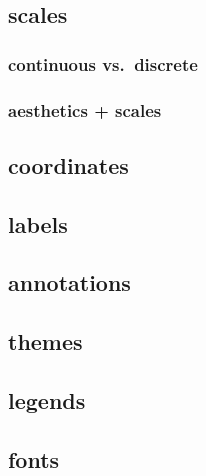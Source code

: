 \documentclass[
]{book}
\begin{document}
\hypertarget{scales}{%
\subsection*{scales}\label{scales}}

\hypertarget{continuous-vs.-discrete}{%
\subsubsection*{continuous vs.~discrete}\label{continuous-vs.-discrete}}

\hypertarget{aesthetics-scales}{%
\subsubsection*{aesthetics + scales}\label{aesthetics-scales}}

\hypertarget{coordinates}{%
\subsection*{coordinates}\label{coordinates}}

\hypertarget{labels}{%
\subsection*{labels}\label{labels}}

\hypertarget{annotations}{%
\subsection*{annotations}\label{annotations}}

\hypertarget{themes}{%
\subsection*{themes}\label{themes}}

\hypertarget{legends}{%
\subsection*{legends}\label{legends}}

\hypertarget{fonts}{%
\subsection*{fonts}\label{fonts}}
\end{document}
